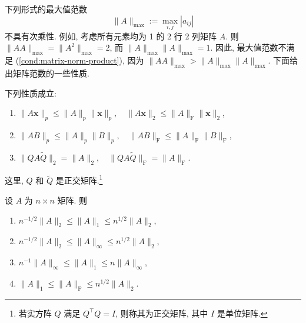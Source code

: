 {下列形式的最大值范数}
\[
\|A\|_{\max}:=\max_{i,j}|a_{ij}|
\]
{不具有次乘性. 例如, 考虑所有元素均为 1 的 2 行 2 列矩阵 $A$. 则 $\|AA\|_{\max}=\|A^2\|_{\max}=2$, 而 $\|A\|_{\max}\|A\|_{\max}=1$. 因此, 最大值范数不满足 (\ref{cond:matrix-norm-product}), 因为 $\|AA\|_{\max}>\|A\|_{\max}\|A\|_{\max}$.}
{下面给出矩阵范数的一些性质.}
\begin{Theorem}\label{thm:matrix-norm-properties}
{下列性质成立:}
\begin{enumerate}[label=(\arabic*),ref=\arabic*]
\item\label{part:matrix-norm-action} $\|A\bm x\|_p\le\|A\|_p\|\bm x\|_p,\quad\|A\bm x\|_2\le\|A\|_{\mathrm F}\|\bm x\|_2$,
\item $\|AB\|_p\le\|A\|_p\|B\|_p,\quad\|AB\|_{\mathrm F}\le\|A\|_{\mathrm F}\|B\|_{\mathrm F}$,
\item $\|QA\tilde Q\|_2=\|A\|_2,\quad\|QA\tilde Q\|_{\mathrm F}=\|A\|_{\mathrm F}$.
\end{enumerate}
{这里, $Q$ 和 $\tilde Q$ 是正交矩阵.\footnote{若实方阵 $Q$ 满足 $Q^\top Q=I$, 则称其为正交矩阵, 其中 $I$ 是单位矩阵.}}
\end{Theorem}
\begin{Theorem}\label{thm:matrix-norm-comparisons}
{设 $A$ 为 $n\times n$ 矩阵. 则}
\begin{enumerate}[label=(\arabic*)]
\item $n^{-1/2}\|A\|_2\le\|A\|_1\le n^{1/2}\|A\|_2$,
\item $n^{-1/2}\|A\|_2\le\|A\|_\infty\le n^{1/2}\|A\|_2$,
\item $n^{-1}\|A\|_\infty\le\|A\|_1\le n\|A\|_\infty$,
\item $\|A\|_1\le\|A\|_{\mathrm F}\le n^{1/2}\|A\|_2$.
\end{enumerate}
\end{Theorem}
